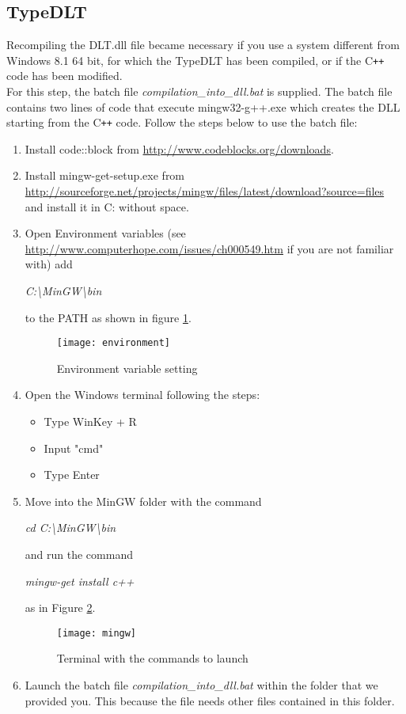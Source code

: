 \subsection{TypeDLT}
Recompiling the DLT.dll file became necessary if you use a system different from Windows 8.1 64 bit, for which the TypeDLT has been compiled, or if the C\texttt{++} code has been modified.\\
For this step, the batch file \textit{compilation\_into\_dll.bat} is supplied. The batch file contains two lines of code that execute mingw32-g++.exe which creates the DLL starting from the C\texttt{++} code. Follow the steps below to use the batch file:
\begin{enumerate}
\item Install code::block from \url{http://www.codeblocks.org/downloads}.
\item Install mingw-get-setup.exe from \url{http://sourceforge.net/projects/mingw/files/latest/download?source=files} and install it in C: without space.
\item Open Environment variables (see \url{http://www.computerhope.com/issues/ch000549.htm} if you are not familiar with) add  
\begin{center}
\textit{C:\textbackslash MinGW\textbackslash bin}
\end{center} to the PATH as shown in figure \ref{img2:environment}.

\begin{figure}[h]
\centering
\texttt{[image: environment]}
\caption{\label{img2:environment} Environment variable setting}
\end{figure}


\item Open the Windows terminal following the steps:
\begin{itemize}
\item Type WinKey + R
\item Input "cmd"
\item Type Enter
\end{itemize}
\item Move into the MinGW folder with the command


 \begin{center}
  \textit{cd C:\textbackslash MinGW\textbackslash bin}   \end{center}  and run the command \begin{center}
  \textit{mingw-get install c++}  \end{center} 
as in Figure \ref{img2:mingw}.

\begin{figure}[h]
\centering
\texttt{[image: mingw]}
\caption{\label{img2:mingw} Terminal with the commands to launch}
\end{figure}

\item Launch the batch file \textit{compilation\_into\_dll.bat} within the folder that we provided you. This because the file needs other files contained in this folder.
\end{enumerate}



